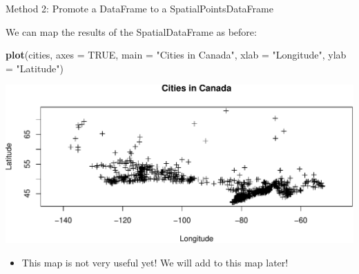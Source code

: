\documentclass[10pt,ignorenonframetext,]{beamer}
\newenvironment{Shaded}{\begin{snugshade}}{\end{snugshade}}
\newcommand{\KeywordTok}[1]{\textcolor[rgb]{0.13,0.29,0.53}{\textbf{{#1}}}}
\newcommand{\DataTypeTok}[1]{\textcolor[rgb]{0.13,0.29,0.53}{{#1}}}
\newcommand{\StringTok}[1]{\textcolor[rgb]{0.31,0.60,0.02}{{#1}}}
\newcommand{\OtherTok}[1]{\textcolor[rgb]{0.56,0.35,0.01}{{#1}}}
\newcommand{\NormalTok}[1]{{#1}}
\providecommand{\tightlist}{%
  \setlength{\itemsep}{0pt}\setlength{\parskip}{0pt}}
\begin{document}
\begin{frame}[fragile]{Method 2: Promote a DataFrame to a
SpatialPointsDataFrame}

We can map the results of the SpatialDataFrame as before:

\begin{Shaded}
\begin{Highlighting}[]
\KeywordTok{plot}\NormalTok{(cities, }\DataTypeTok{axes =} \OtherTok{TRUE}\NormalTok{, }\DataTypeTok{main =} \StringTok{"Cities in Canada"}\NormalTok{, }
    \DataTypeTok{xlab =} \StringTok{"Longitude"}\NormalTok{, }\DataTypeTok{ylab =} \StringTok{"Latitude"}\NormalTok{)}
\end{Highlighting}
\end{Shaded}

\begin{center}\includegraphics[width=0.8\linewidth]{SpatialDataLecture_files/figure-beamer/unnamed-chunk-13-1} \end{center}

\begin{itemize}
\tightlist
\item
  This map is not very useful yet! We will add to this map later!
\end{itemize}

\end{frame}
\end{document}
